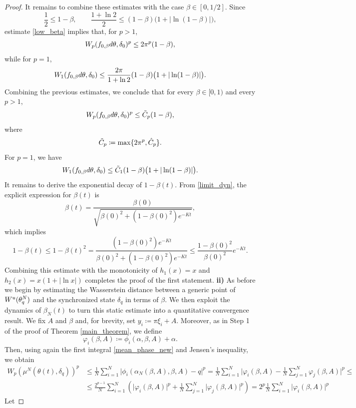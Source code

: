 \documentclass[10pt,a4paper]{amsart}
\renewcommand{\d}{\textnormal{d}}
\newcommand{\jump}{\hfill\break}
\renewcommand{\u}{\textnormal{u}}
\begin{document}
\begin{proof}
    It remains to combine these estimates with the case $\beta\in[0,1/2]$. Since
    $$\frac12\leq1-\beta, \qquad \frac{1+\ln2}{2}\leq(1-\beta)\bigl(1+|\ln(1-\beta)|\bigr),$$
    estimate \eqref{low_beta} implies that, for $p>1$,
    $$W_p(f_{0,\beta}\d\theta,\delta_0)^p \leq2\pi^p(1-\beta),$$
    while for $p=1$,
    $$W_1(f_{0,\beta}\d\theta,\delta_0) \leq \frac{2\pi}{1+\ln2} (1-\beta)\bigl(1+|\ln(1-\beta)|\bigr).$$
    Combining the previous estimates, we conclude that for every $\beta\in[0,1)$ and every $p>1$,
    $$W_p(f_{0,\beta}\d\theta,\delta_0)^p \leq \Tilde{C}_p(1-\beta),$$
    where
    $$\Tilde{C}_p\coloneqq\max\{2\pi^p,\hat{C}_p\}.$$
    For $p=1$, we have
    $$W_1(f_{0,\beta}\d\theta,\delta_0) \leq \Tilde{C}_1(1-\beta)\bigl(1+|\ln(1-\beta)|\bigr).$$
    It remains to derive the exponential decay of $1-\beta(t)$. From \eqref{limit_dyn}, the explicit expression for $\beta(t)$ is
    $$\beta(t)=\frac{\beta(0)} {\sqrt{\beta(0)^2+(1-\beta(0)^2)e^{-Kt}}},$$
    which implies
    $$1-\beta(t) \leq 1-\beta(t)^2 = \frac{(1-\beta(0)^2)e^{-Kt}} {\beta(0)^2+(1-\beta(0)^2)e^{-Kt}} \leq \frac{1-\beta(0)^2}{\beta(0)^2}e^{-Kt}.$$
    Combining this estimate with the monotonicity of $h_1(x)=x$ and $h_2(x)=x(1+|\ln x|)$ completes the proof of the first statement. \jump\jump
    \textbf{ii)} As before we begin by estimating the Wasserstein distance between a generic point of $W^\u(\theta_q^N)$ and the synchronized state $\delta_q$ in terms of $\beta$. We then exploit the dynamics of $\beta_N(t)$ to turn this static estimate into a quantitative convergence result.\jump\jump\noindent
     We fix $A$ and $\beta$ and, for brevity, set $y_i\coloneqq\pi\xi_i+A.$ Moreover, as in Step 1 of the proof of Theorem \ref{main_theorem}, we define
    $$\varphi_i(\beta,A)\coloneqq\phi_i(\alpha,\beta,A)+\alpha.$$
    Then, using again the first integral \eqref{mean_phase_new} and Jensen's inequality, we obtain 
    \begin{align*}
           W_p\left(\mu^N(\theta(t),\delta_{q})\right)^p&\leq\frac{1}{N}\sum_{i=1}^N\Big|\phi_i(\alpha_N(\beta,A),\beta,A)-q\Big|^p=\frac{1}{N}\sum_{i=1}^N\Big|\varphi_i(\beta,A)-\frac{1}{N}\sum_{j=1}^N\varphi_j(\beta,A)\Big|^p\leq\\
           &\leq\frac{2^{p-1}}{N}\sum_{i=1}^N\left(\big|\varphi_i(\beta,A)\big|^p+\frac{1}{N}\sum_{j=1}^N\big|\varphi_j(\beta,A)\big|^p\right)=2^p\frac{1}{N}\sum_{i=1}^N\big|\varphi_i(\beta,A)\big|^p
       \end{align*}
       Let

\end{proof}
\end{document}
